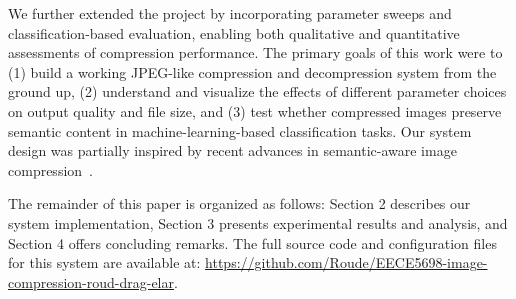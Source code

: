 We further extended the project by incorporating parameter sweeps and classification-based evaluation, enabling both qualitative and quantitative assessments of compression performance. The primary goals of this work were to (1) build a working JPEG-like compression and decompression system from the ground up, (2) understand and visualize the effects of different parameter choices on output quality and file size, and (3) test whether compressed images preserve semantic content in machine-learning-based classification tasks. Our system design was partially inspired by recent advances in semantic-aware image compression~\cite{semanticDiffusion2023}.


The remainder of this paper is organized as follows: Section 2 describes our system implementation, Section 3 presents experimental results and analysis, and Section 4 offers concluding remarks.
The full source code and configuration files for this system are available at: \url{https://github.com/Roude/EECE5698-image-compression-roud-drag-elar}.
